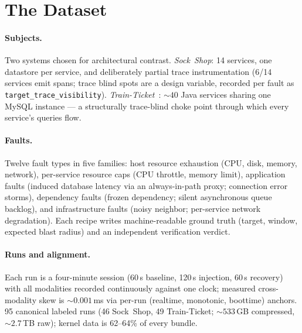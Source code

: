 \section{The \sys{} Dataset}
\label{sec:dataset}

\paragraph{Subjects.} Two systems chosen for architectural contrast.
\emph{Sock~Shop}: 14 services, one datastore per service, and deliberately partial
trace instrumentation (6/14 services emit spans; trace blind spots are a design
variable, recorded per fault as \texttt{target\_trace\_visibility}).
\emph{Train-Ticket}~\cite{zhou2018trainticket}: ${\sim}40$ Java services sharing one
MySQL instance --- a structurally trace-blind choke point through which every service's
queries flow.

\paragraph{Faults.} Twelve fault types in five families: host resource exhaustion
(CPU, disk, memory, network), per-service resource caps (CPU throttle, memory limit),
application faults (induced database latency via an always-in-path proxy; connection
error storms), dependency faults (frozen dependency; silent asynchronous queue
backlog), and infrastructure faults (noisy neighbor; per-service network degradation).
Each recipe writes machine-readable ground truth (target, window, expected blast
radius) and an independent verification verdict.

\paragraph{Runs and alignment.} Each run is a four-minute session (60\,s baseline,
120\,s injection, 60\,s recovery) with all modalities recorded continuously against
one clock; measured cross-modality skew is ${\sim}0.001$\,ms via per-run
(realtime, monotonic, boottime) anchors. 95 canonical labeled runs (46 Sock~Shop,
49 Train-Ticket; ${\sim}533$\,GB compressed, ${\sim}2.7$\,TB raw); kernel data is
62--64\% of every bundle.

